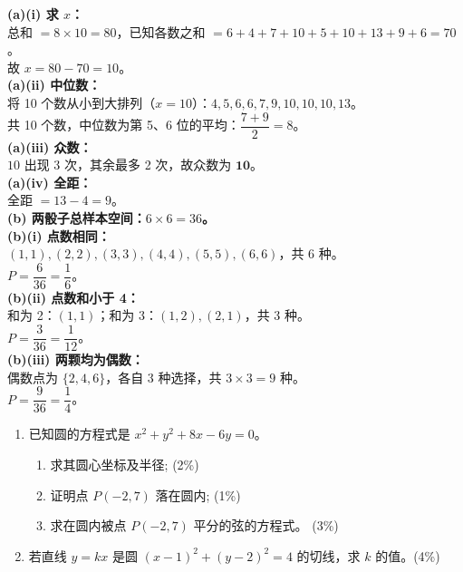 \documentclass[12pt,a4paper]{exam-zh}
\begin{document}
\begin{solution}
    \textbf{(a)(i) 求 $x$：} \\
    总和 $= 8\times10 = 80$，已知各数之和 $= 6+4+7+10+5+10+13+9+6 = 70$。\\
    故 $x = 80 - 70 = 10$。\\
 
    \textbf{(a)(ii) 中位数：} \\
    将 10 个数从小到大排列（$x=10$）：$4,5,6,6,7,9,10,10,10,13$。\\
    共 10 个数，中位数为第 5、6 位的平均：$\dfrac{7+9}{2} = 8$。\\
 
    \textbf{(a)(iii) 众数：} \\
    $10$ 出现 3 次，其余最多 2 次，故众数为 $\mathbf{10}$。\\
 
    \textbf{(a)(iv) 全距：} \\
    全距 $= 13 - 4 = 9$。\\
 
    \textbf{(b) 两骰子总样本空间：$6\times6=36$。} \\
 
    \textbf{(b)(i) 点数相同：} \\
    $(1,1),(2,2),(3,3),(4,4),(5,5),(6,6)$，共 6 种。\\
    $P = \dfrac{6}{36} = \dfrac{1}{6}$。\\
 
    \textbf{(b)(ii) 点数和小于 4：} \\
    和为 2：$(1,1)$；和为 3：$(1,2),(2,1)$，共 3 种。\\
    $P = \dfrac{3}{36} = \dfrac{1}{12}$。\\
 
    \textbf{(b)(iii) 两颗均为偶数：} \\
    偶数点为 $\{2,4,6\}$，各自 3 种选择，共 $3\times3=9$ 种。\\
    $P = \dfrac{9}{36} = \dfrac{1}{4}$。
\end{solution}

\begin{question}
    \begin{enumerate}[label=(\alph*)]
        \item 已知圆的方程式是 $x^2 + y^2 + 8x - 6y = 0$。
        \begin{enumerate}[label=(\roman*)]
            \item 求其圆心坐标及半径; \hfill (2\%)
            \item 证明点 $P(-2, 7)$ 落在圆内; \hfill (1\%)
            \item 求在圆内被点 $P(-2, 7)$ 平分的弦的方程式。 \hfill (3\%)
        \end{enumerate}
        \item 若直线 $y = kx$ 是圆 $(x-1)^2 + (y-2)^2 = 4$ 的切线，求 $k$ 的值。\hfill(4\%)
    \end{enumerate}
\end{question}
\end{document}
